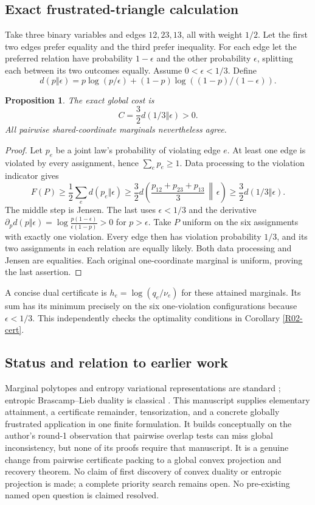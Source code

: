 \documentclass[11pt,a4paper]{article}
\newtheorem{proposition}[theorem]{Proposition}
\theoremstyle{definition}\newtheorem{definition}[theorem]{Definition}
\theoremstyle{remark}\newtheorem{remark}[theorem]{Remark}
\numberwithin{equation}{section}
\begin{document}
\subsection{Exact frustrated-triangle calculation}\label{R02-sec-6}
Take three binary variables and edges $12,23,13$, all with weight $1/2$. Let the first two edges prefer equality and the third prefer inequality. For each edge let the preferred relation have probability $1-\epsilon$ and the other probability $\epsilon$, splitting each between its two outcomes equally. Assume $0<\epsilon<1/3$. Define
\[
d(p\Vert\epsilon)=p\log(p/\epsilon)+(1-p)\log((1-p)/(1-\epsilon)).
\]
\begin{proposition}\label{R02-tri}
The exact global cost is
\[
C=\frac32d(1/3\Vert\epsilon)>0.
\]
All pairwise shared-coordinate marginals nevertheless agree.
\end{proposition}
\begin{proof}
Let $p_e$ be a joint law's probability of violating edge $e$. At least one edge is violated by every assignment, hence $\sum_ep_e\geq1$. Data processing to the violation indicator gives
\[
F(P)\geq\frac12\sum_ed(p_e\Vert\epsilon)
\geq\frac32d\left(\frac{p_{12}+p_{23}+p_{13}}3\,\middle\Vert\,\epsilon\right)
\geq\frac32d(1/3\Vert\epsilon).
\]
The middle step is Jensen. The last uses $\epsilon<1/3$ and the derivative
$\partial_pd(p\Vert\epsilon)=\log\frac{p(1-\epsilon)}{\epsilon(1-p)}>0$ for $p>\epsilon$.
Take $P$ uniform on the six assignments with exactly one violation. Every edge then has violation probability $1/3$, and its two assignments in each relation are equally likely. Both data processing and Jensen are equalities. Each original one-coordinate marginal is uniform, proving the last assertion.
\end{proof}
A concise dual certificate is $h_e=\log(q_e/\nu_e)$ for these attained marginals. Its sum has its minimum precisely on the six one-violation configurations because $\epsilon<1/3$. This independently checks the optimality conditions in Corollary \ref{R02-cert}.

\subsection{Status and relation to earlier work}\label{R02-sec-7}
Marginal polytopes and entropy variational representations are standard \cite{ref063}; entropic Brascamp--Lieb duality is classical \cite{ref060}. This manuscript supplies elementary attainment, a certificate remainder, tensorization, and a concrete globally frustrated application in one finite formulation. It builds conceptually on the author's round-1 observation that pairwise overlap tests can miss global inconsistency, but none of its proofs require that manuscript. It is a genuine change from pairwise certificate packing to a global convex projection and recovery theorem. No claim of first discovery of convex duality or entropic projection is made; a complete priority search remains open. No pre-existing named open question is claimed resolved.
\end{document}
